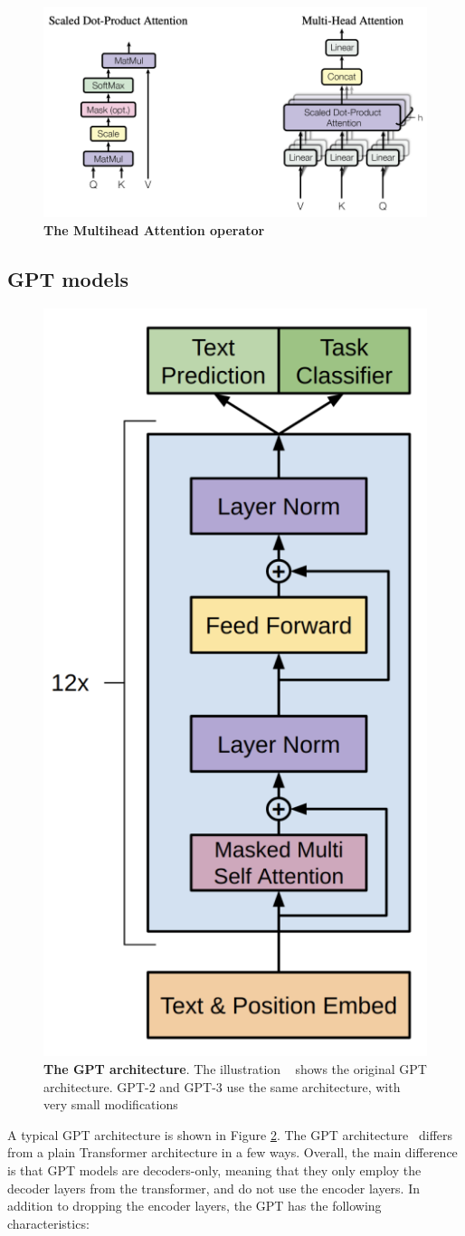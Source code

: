 \begin{figure}[H]
    \centering
    \includegraphics[width=0.6\linewidth]{figures/mha_architecture.png}
    \caption{\textbf{The Multihead Attention operator ~\cite{transformer}}}
    \label{fig:mha}
\end{figure}

\subsection{GPT models}\label{gpt-overview}
\begin{figure}[H]
    \centering
    \includegraphics[width=0.3\linewidth]{figures/gpt1_architecture.png}
    \caption{\textbf{The GPT architecture}. The illustration ~\cite{gpt1} shows the original GPT architecture. GPT-2 and GPT-3 use the same architecture, with very small modifications }
    \label{fig:gpt-original}
\end{figure}
A typical GPT architecture is shown in Figure \ref{fig:gpt-original}.
The GPT architecture~\cite{gpt1, gpt2} differs from a plain Transformer architecture in a few ways. Overall, the main difference is that GPT models are decoders-only, meaning that they only employ the decoder layers from the transformer, and do not use the encoder layers. In addition to dropping the encoder layers, the GPT has the following characteristics:
